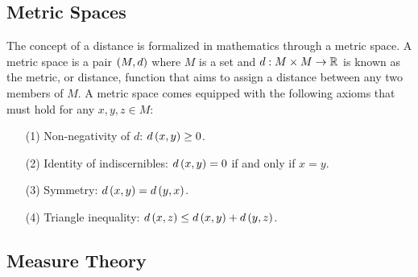 \fi



\subsection{Metric Spaces}

The concept of a distance is formalized in mathematics through a metric space.
A metric space is a pair \(\left(M, d\right)\) where \(M\) is a set
and \(d : M \times M \to \mathbb{R}\) is known as the metric, or distance,
function that aims to assign a distance between any two members of \(M\).
A metric space comes equipped with the following axioms
that must hold for any \(x, y, z \in M\):
\begin{enumerate}
  \item[(1)]
    Non-negativity of \(d\): \(d\left(x, y\right) \geq 0\).

  \item[(2)]
    Identity of indiscernibles:
    \(d\left(x, y\right) = 0\) if and only if \(x = y\).

  \item[(3)]
    Symmetry:
    \(d\left(x, y\right) = d\left(y, x\right)\).

  \item[(4)]
    Triangle inequality:
    \(d\left(x, z\right) \leq d\left(x, y\right) + d\left(y, z\right)\).

\end{enumerate}


\begin{example}
\end{example}


\subsection{Measure Theory}



\begin{example}
\end{example}



\begin{example}
\end{example}


